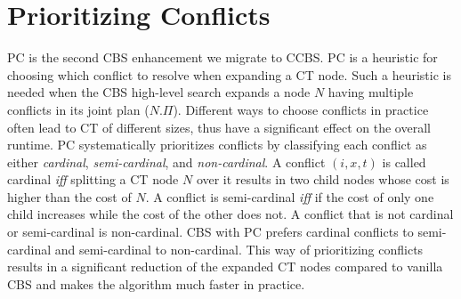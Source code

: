 \documentclass[letterpaper]{article} %
\newcommand{\cbs}{\ac{CBS}\xspace}
\newcommand{\icbs}{\ac{ICBS}\xspace}
\newcommand{\ccbs}{\ac{CCBS}\xspace}
\newcommand{\ct}{\ac{CT}\xspace}
\newcommand{\pc}{\ac{PC}\xspace}
\begin{document}
\section{Prioritizing Conflicts}







\acf{PC} \cite{BoyarskiFSSTBS15} is the second \cbs enhancement we migrate to \ccbs.
\pc is a heuristic for choosing which conflict to resolve when expanding a \ct node.
Such a heuristic is needed when the \cbs high-level search expands a node $N$ having multiple conflicts in its joint plan ($N.\Pi$). %
Different ways to choose conflicts in practice often lead to \ct of different sizes,
thus have a significant effect on the overall runtime.
\pc systematically prioritizes conflicts by classifying each conflict as either \emph{cardinal}, \emph{semi-cardinal}, and \emph{non-cardinal}.
A conflict $(i,x,t)$ is called cardinal \emph{iff} splitting a \ct node $N$ over it results in two child nodes
whose cost is higher than the cost of $N$.
A conflict is semi-cardinal \emph{iff} if the cost of only one child increases while the cost of the other does not.
A conflict that is not cardinal or semi-cardinal is non-cardinal.
\cbs with \pc prefers cardinal conflicts to semi-cardinal and semi-cardinal to non-cardinal.
This way of prioritizing conflicts results in a significant reduction of the expanded \ct nodes compared to vanilla \cbs and makes the algorithm much faster in practice.
\end{document}
